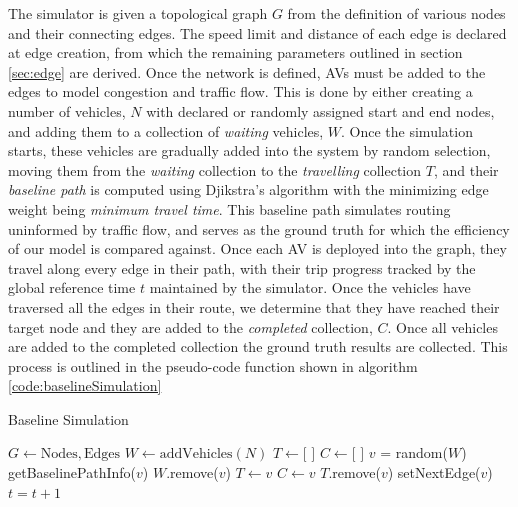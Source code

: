 \documentclass[conference]{IEEEtran}
\begin{document}
The simulator is given a topological graph $G$ from the definition of various nodes and their connecting edges. The speed limit and distance of each edge is declared at edge creation, from which the remaining parameters outlined in section \ref{sec:edge} are derived. Once the network is defined, AVs must be added to the edges to model congestion and traffic flow. This is done by either creating a number of vehicles, $N$ with declared or randomly assigned start and end nodes, and adding them to a collection of \textit{waiting} vehicles, $W$. Once the simulation starts, these vehicles are gradually added into the system by random selection, moving them from the \textit{waiting} collection to the \textit{travelling} collection $T$, and their \textit{baseline path} is computed using Djikstra's algorithm with the minimizing edge weight being \textit{minimum travel time}. This baseline path simulates routing uninformed by traffic flow, and serves as the ground truth for which the efficiency of our model is compared against. Once each AV is deployed into the graph, they travel along every edge in their path, with their trip progress tracked by the global reference time $t$ maintained by the simulator. Once the vehicles have traversed all the edges in their route, we determine that they have reached their target node and they are added to the \textit{completed} collection, $C$. Once all vehicles are added to the completed collection the ground truth results are collected. This process is outlined in the pseudo-code function shown in algorithm \ref{code:baselineSimulation}

\begin{algorithm}
	\caption{Baseline Simulation}\label{code:baselineSimulation}
	\begin{algorithmic}[1]
	    \State $G \gets \text{Nodes}, \text{Edges}$
	    \State $W \gets \text{addVehicles}(N)$
	    \State $T \gets \text{[ ]}$
	    \State $C \gets \text{[ ]}$
	                \State $v$ = random($W$)
	                \State getBaselinePathInfo($v$)
	                \State $W$.remove($v$)
	                \State $T \gets v$
	            \EndIf
	        \EndIf
	                    \State $C \gets v$
	                    \State $T$.remove($v$)
	                \Else
	                    \State setNextEdge($v$)
	                \EndIf
	            \EndIf
	        \EndFor
	       \State $t = t + 1$
	    \EndWhile
	\end{algorithmic} 
\end{algorithm}
\end{document}
